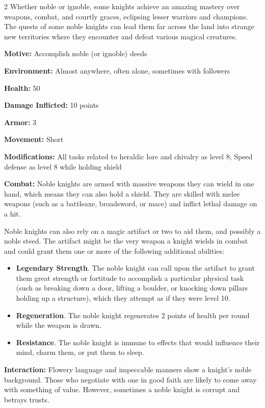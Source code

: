 \begin{multicols}{2}
Whether noble or ignoble, some knights achieve an amazing mastery over weapons, combat, and courtly graces, eclipsing lesser warriors and champions. The quests of some noble knights can lead them far across the land into strange new territories where they encounter and defeat various magical creatures. 

\textbf{Motive:} Accomplish noble (or ignoble) deeds 

\textbf{Environment:} Almost anywhere, often alone, sometimes with followers 

\textbf{Health:} 50 

\textbf{Damage Inflicted:} 10 points 

\textbf{Armor:} 3 

\textbf{Movement:} Short 

\textbf{Modifications:} All tasks related to heraldic lore and chivalry as level 8; Speed defense as level 8 while holding shield 

\textbf{Combat:} Noble knights are armed with massive weapons they can wield in one hand, which means they can also hold a shield. They are skilled with melee weapons (such as a battleaxe, broadsword, or mace) and inflict lethal damage on a hit. 

Noble knights can also rely on a magic artifact or two to aid them, and possibly a noble steed. The artifact might be the very weapon a knight wields in combat and could grant them one or more of the following additional abilities: 

\begin{itemize}
\item \textbf{Legendary Strength}. The noble knight can call upon the artifact to grant them great strength or fortitude to accomplish a particular physical task (such as breaking down a door, lifting a boulder, or knocking down pillars holding up a structure), which they attempt as if they were level 10. 

\item \textbf{Regeneration}. The noble knight regenerates 2 points of health per round while the weapon is drawn. 

\item \textbf{Resistance}. The noble knight is immune to effects that would influence their mind, charm them, or put them to sleep. 
\end{itemize}

\textbf{Interaction:} Flowery language and impeccable manners show a knight’s noble background. Those who negotiate with one in good faith are likely to come away with something of value. However, sometimes a noble knight is corrupt and betrays trusts. 


\end{multicols}
